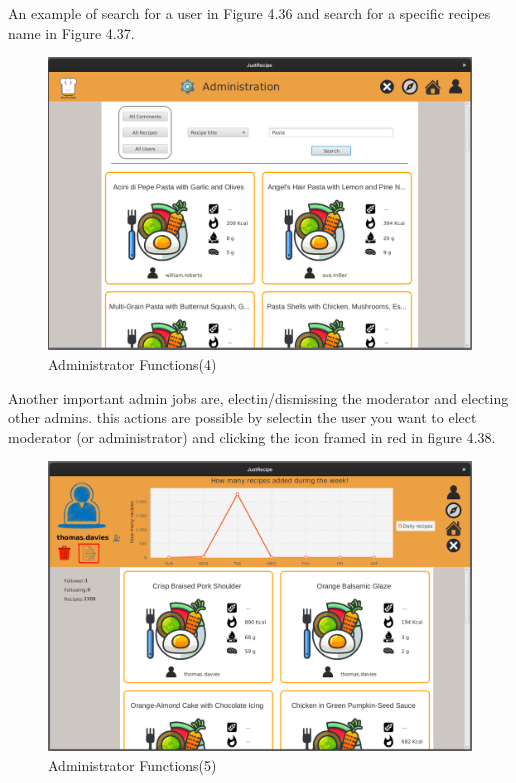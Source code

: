 \documentclass[a4paper]{report}
\begin{document}
\noindent An example of search for a user in Figure 4.36 and search for a specific recipes name in Figure 4.37.
\begin{figure}[htpb]
	\centering
	\includegraphics[scale=0.37]{img/user_manual/administratorFunction4.png}
	\caption{Administrator Functions(4)}
\end{figure}

\noindent Another important admin jobs are, electin/dismissing the moderator and electing other admins. this actions are possible by selectin the user you want to elect moderator (or administrator) and clicking the icon framed in red in figure 4.38.
\begin{figure}[htpb]
	\centering
	\includegraphics[scale=0.37]{img/user_manual/administratorFunction5.png}
	\caption{Administrator Functions(5)}
\end{figure}
\end{document}
